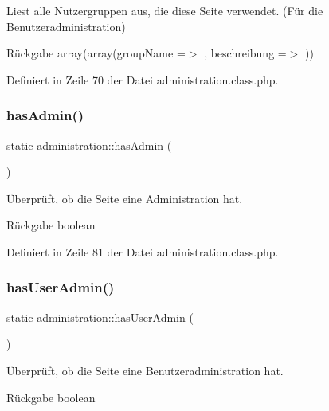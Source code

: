 Liest alle Nutzergruppen aus, die diese Seite verwendet. (Für die Benutzeradministration) \begin{DoxyReturn}{Rückgabe}
array(array(\textquotesingle{}group\+Name\textquotesingle{} =$>$ \textquotesingle{}\textquotesingle{}, \textquotesingle{}beschreibung\textquotesingle{} =$>$ \textquotesingle{}\textquotesingle{})) 
\end{DoxyReturn}


Definiert in Zeile 70 der Datei administration.\+class.\+php.

\mbox{\label{classadministration_a500529e718fd5775e5bcc326b168781d}} 
\subsubsection{\texorpdfstring{has\+Admin()}{hasAdmin()}}
{\footnotesize\ttfamily static administration\+::has\+Admin (\begin{DoxyParamCaption}{ }\end{DoxyParamCaption})\hspace{0.3cm}{\ttfamily [static]}}

Überprüft, ob die Seite eine Administration hat. \begin{DoxyReturn}{Rückgabe}
boolean 
\end{DoxyReturn}


Definiert in Zeile 81 der Datei administration.\+class.\+php.

\mbox{\label{classadministration_a497ff7a8a447f8a9f8cee175723e730c}} 
\subsubsection{\texorpdfstring{has\+User\+Admin()}{hasUserAdmin()}}
{\footnotesize\ttfamily static administration\+::has\+User\+Admin (\begin{DoxyParamCaption}{ }\end{DoxyParamCaption})\hspace{0.3cm}{\ttfamily [static]}}

Überprüft, ob die Seite eine Benutzeradministration hat. \begin{DoxyReturn}{Rückgabe}
boolean 
\end{DoxyReturn}


